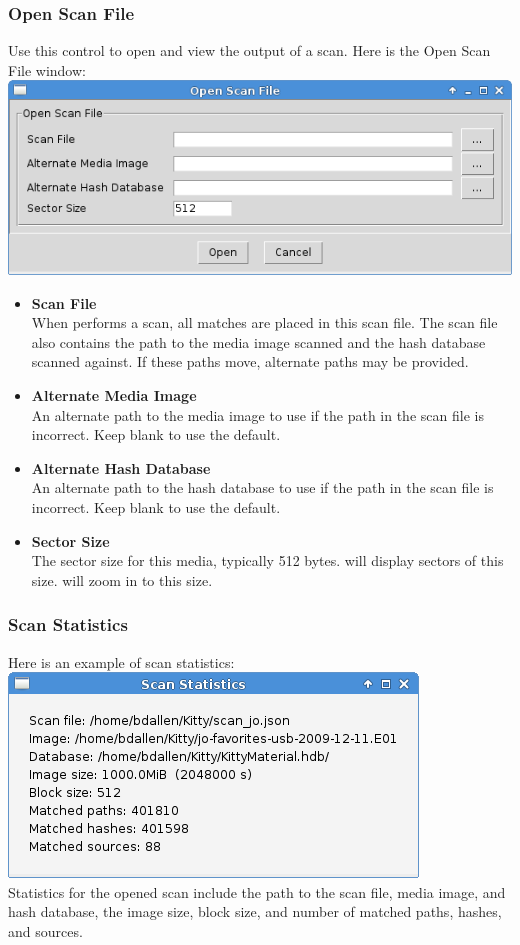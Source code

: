 \documentclass[11pt,fleqn]{article} %
\begin{document}
\subsubsection{Open Scan File}
Use this control to open and view the output of a \hdb scan. Here is the Open Scan File window:\\
\includegraphics[scale=.4]{screenshots/open_scan_file}\\
\begin{itemize}
\item \textbf{Scan File}\\
When \hdb performs a scan, all matches are placed in this scan file. The scan file also contains the path to the media image scanned and the hash database scanned against. If these paths move, alternate paths may be provided.
\item \textbf{Alternate Media Image}\\
An alternate path to the media image to use if the path in the scan file is incorrect. Keep blank to use the default.
\item \textbf{Alternate Hash Database}\\
An alternate path to the hash database to use if the path in the scan file is incorrect. Keep blank to use the default.
\item \textbf{Sector Size}\\
The sector size for this media, typically 512 bytes. \sscope will display sectors of this size. \sscope will zoom in to this size.
\end{itemize}

\subsubsection{Scan Statistics}
Here is an example of scan statistics:\\
\includegraphics[scale=.4]{screenshots/scan_statistics}\\
Statistics for the opened scan include the path to the scan file, media image, and hash database, the image size, block size, and number of matched paths, hashes, and sources.
\end{document}
